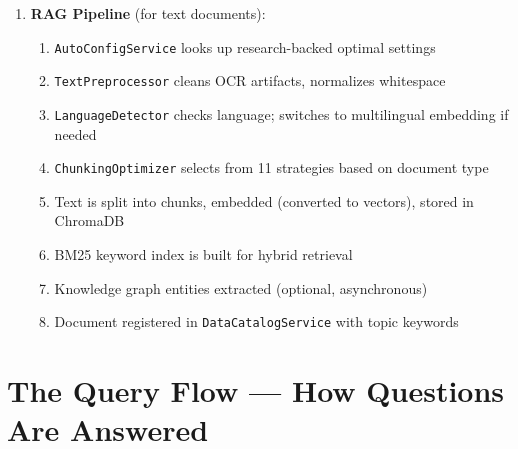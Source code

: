 \documentclass[12pt, a4paper, oneside]{report}
\newcommand{\kw}[1]{\texttt{\small #1}}
\begin{document}
\begin{enumerate}
  \item \textbf{RAG Pipeline} (for text documents):
        \begin{enumerate}
          \item \kw{AutoConfigService} looks up research-backed optimal settings
          \item \kw{TextPreprocessor} cleans OCR artifacts, normalizes whitespace
          \item \kw{LanguageDetector} checks language; switches to multilingual embedding if needed
          \item \kw{ChunkingOptimizer} selects from 11 strategies based on document type
          \item Text is split into chunks, embedded (converted to vectors), stored in ChromaDB
          \item BM25 keyword index is built for hybrid retrieval
          \item Knowledge graph entities extracted (optional, asynchronous)
          \item Document registered in \kw{DataCatalogService} with topic keywords
        \end{enumerate}
\end{enumerate}

\section{The Query Flow — How Questions Are Answered}
\end{document}
